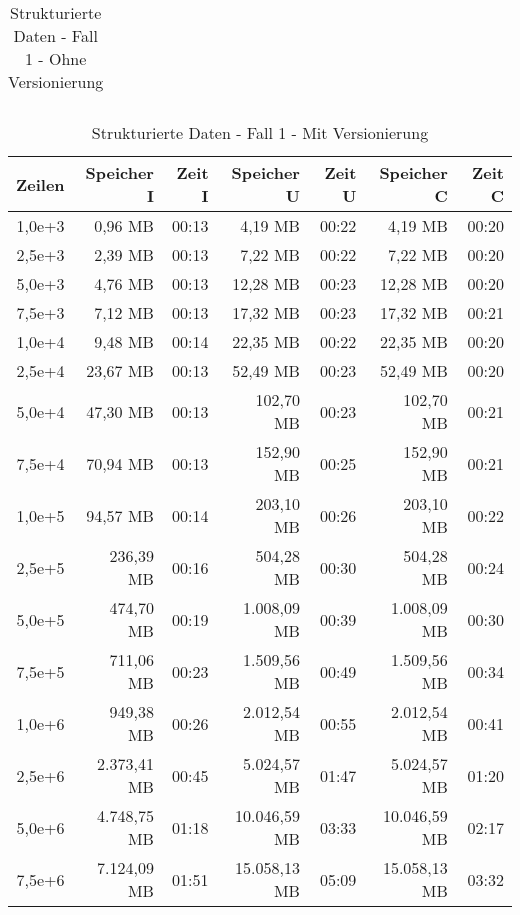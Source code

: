 \begin{table}
\begin{tabular}{|r|r|r|r|r|r|r|}
    \end{tabular}
    \caption{Strukturierte Daten - Fall 1 - Ohne Versionierung}
\end{table}

\begin{table}
    \centering
    \begin{tabular}{|r|r|r|r|r|r|r|}
        \hline
        \textbf{Zeilen} & \textbf{Speicher I} & \textbf{Zeit I} & \textbf{Speicher U} & \textbf{Zeit U} & \textbf{Speicher C} & \textbf{Zeit C} \\ \hline
        1,0e+3  & 0,96 MB       & 00:13 & 4,19 MB       & 00:22 & 4,19 MB       & 00:20 \\ \hline
        2,5e+3  & 2,39 MB       & 00:13 & 7,22 MB       & 00:22 & 7,22 MB       & 00:20 \\ \hline
        5,0e+3  & 4,76 MB       & 00:13 & 12,28 MB      & 00:23 & 12,28 MB      & 00:20 \\ \hline
        7,5e+3  & 7,12 MB       & 00:13 & 17,32 MB      & 00:23 & 17,32 MB      & 00:21 \\ \hline
        1,0e+4  & 9,48 MB       & 00:14 & 22,35 MB      & 00:22 & 22,35 MB      & 00:20 \\ \hline
        2,5e+4  & 23,67 MB      & 00:13 & 52,49 MB      & 00:23 & 52,49 MB      & 00:20 \\ \hline
        5,0e+4  & 47,30 MB      & 00:13 & 102,70 MB     & 00:23 & 102,70 MB     & 00:21 \\ \hline
        7,5e+4  & 70,94 MB      & 00:13 & 152,90 MB     & 00:25 & 152,90 MB     & 00:21 \\ \hline
        1,0e+5  & 94,57 MB      & 00:14 & 203,10 MB     & 00:26 & 203,10 MB     & 00:22 \\ \hline
        2,5e+5  & 236,39 MB     & 00:16 & 504,28 MB     & 00:30 & 504,28 MB     & 00:24 \\ \hline
        5,0e+5  & 474,70 MB     & 00:19 & 1.008,09 MB   & 00:39 & 1.008,09 MB   & 00:30 \\ \hline
        7,5e+5  & 711,06 MB     & 00:23 & 1.509,56 MB   & 00:49 & 1.509,56 MB   & 00:34 \\ \hline
        1,0e+6 & 949,38 MB     & 00:26 & 2.012,54 MB   & 00:55 & 2.012,54 MB   & 00:41 \\ \hline
        2,5e+6 & 2.373,41 MB   & 00:45 & 5.024,57 MB   & 01:47 & 5.024,57 MB   & 01:20 \\ \hline
        5,0e+6 & 4.748,75 MB   & 01:18 & 10.046,59 MB  & 03:33 & 10.046,59 MB  & 02:17 \\ \hline
        7,5e+6 & 7.124,09 MB   & 01:51 & 15.058,13 MB  & 05:09 & 15.058,13 MB  & 03:32 \\ \hline
    \end{tabular}
    \caption{Strukturierte Daten - Fall 1 - Mit Versionierung}
\end{table}

